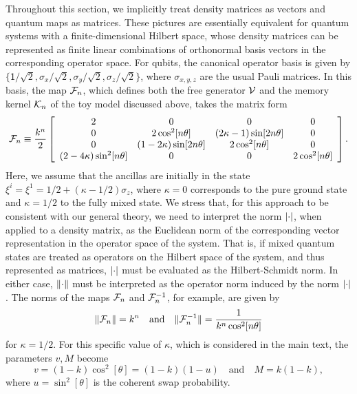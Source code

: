 \documentclass[aps,prl,reprint]{revtex4-2}
\begin{document}
Throughout this section, we implicitly treat density matrices as vectors and quantum maps as matrices.
These pictures are essentially equivalent for quantum systems with a finite-dimensional Hilbert space, whose density matrices can be represented as finite linear combinations of orthonormal basis vectors in the corresponding operator space.
For qubits, the canonical operator basis is given by $\bigl\{\mathsf{1}/\sqrt{2},\sigma_x/\sqrt{2},\sigma_y/\sqrt{2},\sigma_z/\sqrt{2}\bigr\}$, where $\sigma_{x,y,z}$ are the usual Pauli matrices.
In this basis, the map $\mathcal{F}_n$, which defines both the free generator $\mathcal{V}$ and the memory kernel $\mathcal{K}_n$ of the toy model discussed above, takes the matrix form
\begin{equation}
\mathcal{F}_n\equiv \frac{k^n}{2}\left[
\begin{array}{cccc}
2         &           0           &           0           & 0\\
0          & 2\cos^2[n\theta]  & (2\kappa-1)\sin[2n\theta] &   0\\
0          & (1-2\kappa)\sin[2n\theta] & 2\cos^2[n\theta]  &   0\\
(2-4\kappa)\sin^ 2[n\theta]    & 0 &       0           &           2\cos^2[n\theta]
\end{array}
\right].
\end{equation}
Here, we assume that the ancillas are initially in the state $\xi^i = \xi^1= 1/2+(\kappa-1/2)\sigma_z$, where $\kappa=0$ corresponds to the pure ground state and $\kappa=1/2$ to the fully mixed state.
We stress that, for this approach to be consistent with our general theory, we need to interpret the norm $\lvert \cdot \rvert$, when applied to a density matrix, as the Euclidean norm of the corresponding vector representation in the operator space of the system.
That is, if mixed quantum states are treated as operators on the Hilbert space of the system, and thus represented as matrices, $\lvert \cdot \rvert$ must be evaluated as the Hilbert-Schmidt norm.
In either case, $\lVert \cdot \rVert$ must be interpreted as the operator norm induced by the norm $\lvert \cdot \rvert$.
The norms of the maps $\mathcal{F}_n$ and $\mathcal{F}_n^{-1}$, for example, are given by
\begin{equation}
\lVert \mathcal{F}_n \rVert= k^n
\quad\text{and} \quad
\lVert \mathcal{F}_n^{-1} \rVert= \frac{1}{k^n\cos^2[n\theta]}
\end{equation}
for $\kappa =1/2$.
For this specific value of $\kappa$, which is considered in the main text, the parameters $v,M$ become
\begin{equation}
v= (1-k)\cos^2[\theta]=(1-k)(1-u)
\quad\text{and}\quad
M=k(1-k),
\end{equation}
where $u=\sin^2[\theta]$ is the coherent swap probability.
\end{document}
